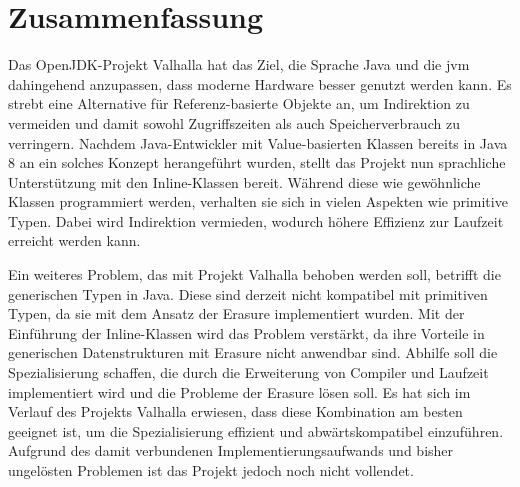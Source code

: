 \section{Zusammenfassung}\label{sec:summary}

Das OpenJDK-Projekt Valhalla hat das Ziel, die Sprache Java und die \ac{jvm} dahingehend anzupassen, dass moderne Hardware besser genutzt werden kann.
Es strebt eine Alternative für Referenz-basierte Objekte an, um Indirektion zu vermeiden und damit sowohl Zugriffszeiten als auch Speicherverbrauch zu verringern.
Nachdem Java-Entwickler mit Value-basierten Klassen bereits in Java 8 an ein solches Konzept herangeführt wurden, stellt das Projekt nun sprachliche Unterstützung mit den Inline-Klassen bereit.
Während diese wie gewöhnliche Klassen programmiert werden, verhalten sie sich in vielen Aspekten wie primitive Typen.
Dabei wird Indirektion vermieden, wodurch höhere Effizienz zur Laufzeit erreicht werden kann.

Ein weiteres Problem, das mit Projekt Valhalla behoben werden soll, betrifft die generischen Typen in Java.
Diese sind derzeit nicht kompatibel mit primitiven Typen, da sie mit dem Ansatz der Erasure implementiert wurden.
Mit der Einführung der Inline-Klassen wird das Problem verstärkt, da ihre Vorteile in generischen Datenstrukturen mit Erasure nicht anwendbar sind.
Abhilfe soll die Spezialisierung schaffen, die durch die Erweiterung von Compiler und Laufzeit implementiert wird und die Probleme der Erasure lösen soll.
Es hat sich im Verlauf des Projekts Valhalla erwiesen, dass diese Kombination am besten geeignet ist, um die Spezialisierung effizient und abwärtskompatibel einzuführen.
Aufgrund des damit verbundenen Implementierungsaufwands und bisher ungelösten Problemen ist das Projekt jedoch noch nicht vollendet.
